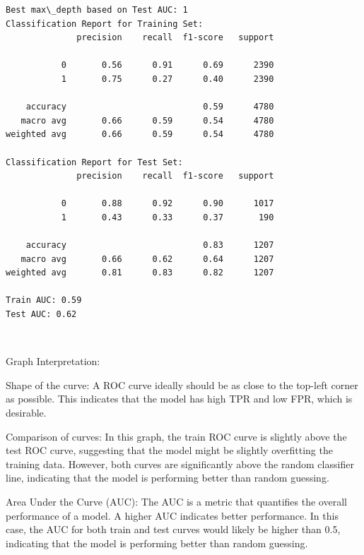 \documentclass[11pt]{article}
\begin{document}
    \begin{Verbatim}[commandchars=\\\{\}]
Best max\_depth based on Test AUC: 1
Classification Report for Training Set:
              precision    recall  f1-score   support

           0       0.56      0.91      0.69      2390
           1       0.75      0.27      0.40      2390

    accuracy                           0.59      4780
   macro avg       0.66      0.59      0.54      4780
weighted avg       0.66      0.59      0.54      4780

Classification Report for Test Set:
              precision    recall  f1-score   support

           0       0.88      0.92      0.90      1017
           1       0.43      0.33      0.37       190

    accuracy                           0.83      1207
   macro avg       0.66      0.62      0.64      1207
weighted avg       0.81      0.83      0.82      1207

Train AUC: 0.59
Test AUC: 0.62
    \end{Verbatim}

    \begin{center}
    \end{center}
    { \hspace*{\fill} \\}
    
    

    Graph Interpretation:

Shape of the curve: A ROC curve ideally should be as close to the
top-left corner as possible. This indicates that the model has high TPR
and low FPR, which is desirable.

Comparison of curves: In this graph, the train ROC curve is slightly
above the test ROC curve, suggesting that the model might be slightly
overfitting the training data. However, both curves are significantly
above the random classifier line, indicating that the model is
performing better than random guessing.

Area Under the Curve (AUC): The AUC is a metric that quantifies the
overall performance of a model. A higher AUC indicates better
performance. In this case, the AUC for both train and test curves would
likely be higher than 0.5, indicating that the model is performing
better than random guessing.
\end{document}
